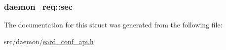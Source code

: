 \subsubsection[{\texorpdfstring{sec}{sec}}]{ daemon\+\_\+req\+::sec}\hypertarget{structdaemon__req_a113e5a11da1ed10af890b01c7c487342}{}\label{structdaemon__req_a113e5a11da1ed10af890b01c7c487342}


The documentation for this struct was generated from the following file\+:\begin{DoxyCompactItemize}
\item 
src/daemon/\hyperlink{eard__conf__api_8h}{eard\+\_\+conf\+\_\+api.\+h}\end{DoxyCompactItemize}
